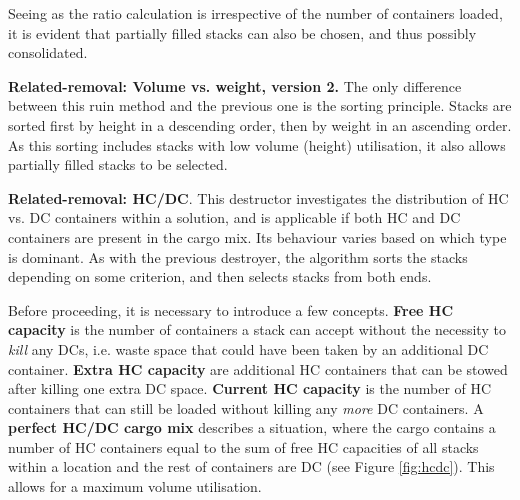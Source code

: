 \documentclass[preprint,12pt,3p]{elsarticle}
\begin{document}
Seeing as the ratio calculation is irrespective of the number of containers loaded, it is evident that partially filled stacks can also be chosen, and thus possibly consolidated.

\textbf{Related-removal: Volume vs. weight, version 2.} The only difference between this ruin method and the previous one is the sorting principle. Stacks are sorted first by height in a descending order, then by weight in an ascending order. As this sorting includes stacks with low volume (height) utilisation, it also allows partially filled stacks to be selected.

\textbf{Related-removal: HC/DC}. This destructor investigates the distribution of HC vs. DC containers within a solution, and is applicable if both HC and DC containers are present in the cargo mix. Its behaviour varies based on which type is dominant. As with the previous destroyer, the algorithm sorts the stacks depending on some criterion, and then selects stacks from both ends. 

Before proceeding, it is necessary to introduce a few concepts. \textbf{Free HC capacity} is the number of containers a stack can accept without the necessity to \textit{kill} any DCs, i.e. waste space that could have been taken by an additional DC container. \textbf{Extra HC capacity} are additional HC containers that can be stowed after killing one extra DC space. \textbf{Current HC capacity} is the number of HC containers that can still be loaded without killing any \textit{more} DC containers. A \textbf{perfect HC/DC cargo mix} describes a situation, where the cargo contains a number of HC containers equal to the sum of free HC capacities of all stacks within a location and the rest of containers are DC (see Figure \ref{fig:hcdc}). This allows for a maximum volume utilisation. 
\end{document}

